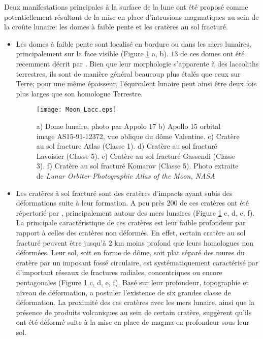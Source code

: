Deux  manifestations principales  à  la  surface de  la  lune ont  été
proposé  comme   potentiellement  résultant   de  la  mise   en  place
d'intrusions magmatiques  au sein  de la croûte  lunaire: les  domes à
faible pente et les cratères au sol fracturé.

\begin{itemize}
\item Les  domes à faible pente  sont localisé en bordure  ou dans les
  mers   lunaires,  principalement   sur  la   face  visible   (Figure
  \ref{Moon-magma} a, b).  $13$ de  ces domes ont été recemment décrit
  par \citet{Wohler:2007it}.  Bien que  leur morphologie s'apparente à
  des laccoliths terrestres, ils sont de manière général beaucoup plus
  étalés que  ceux sur  Terre; pour  une même  épaisseur, l'équivalent
  lunaire  peut ainsi  être deux  fois plus  larges que  son homologue
  Terrestre.

  \begin{figure}[h!]
    \begin{center}
      \graphicspath{ {/Users/thorey/Documents/These/Manuscript/Figure/Chapter1/} }
      \texttt{[image: Moon\_Lacc.eps]}
      \caption{a)  Dome lunaire,  photo  par Appolo  17  b) Apollo  15
        orbital image  AS15-91-12372, vue  oblique du  dôme Valentine.
        c) Cratère au sol fracture Atlas (Classe 1). d) Cratère au sol
        fracturé  Lavoisier (Classe  5).  e)  Cratère au  sol fracturé
        Gassendi  (Classe  3).  f)  Cratère  au  sol fracturé  Komarov
        (Classe   5).   Photo   extraite   de  \textit{Lunar   Orbiter
          Photographic Atlas of the Moon, NASA}}
      \label{Moon-magma}
    \end{center}
  \end{figure}

\item Les  cratères à sol  fracturé sont des cratères  d'impacts ayant
  subis des déformations suite à leur formation.  A peu près $ 200$ de
  ces   cratères  ont   été  répertorié   par  \citet{Schultz:1976kt},
  principalement autour des mers  lunaires (Figure \ref{Moon-magma} c,
  d, e,  f).  La principale  caractéristique de ces cratères  est leur
  faible profondeur  par rapport à  celles des cratères  non déformés.
  En effet, certain  cratère au sol fracturé peuvent  être jusqu'à $2$
  km moins profond que leurs homologues non déformées.  Leur sol, soit
  en  forme de  dôme, soit  plat séparé  des mures  du cratère  par un
  imposant  fossé  circulaire,  est systématiquement  caractérisé  par
  d'important réseaux  de fractures radiales, concentriques  ou encore
  pentagonales (Figure  \ref{Moon-magma} c, d,  e, f).  Basé  sur leur
  profondeur,     topographie     et    niveau     de     déformation,
  \citet{Schultz:1976kt} a postuler l'existence  de six grandes classe
  de  déformation.   La  proximité  des ces  cratères  avec  les  mers
  lunaire, ainsi  que la présence  de produits volcaniques au  sein de
  certain cratère, suggèrent qu'ils ont été déformé suite à la mise en
  place de magma en profondeur sous leur sol.
\end{itemize}

